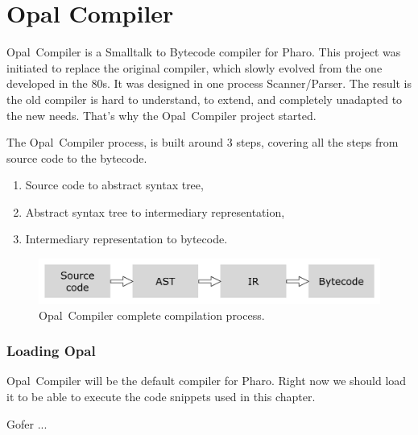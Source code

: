 \documentclass[a4paper,10pt,twoside]{book}
\begin{document}
	\sloppy
\fi


\newcommand{\opal}[0]{Opal~Compiler } %
\chapter{Opal Compiler} 


\opal is a Smalltalk to Bytecode compiler for Pharo. This project was initiated to replace the original compiler, which slowly evolved from the one developed in the 80s. It was designed in one process Scanner/Parser. The result is the old compiler is hard to understand, to extend, and completely unadapted to the new needs. That's why the \opal project started. 

The \opal process, is built around 3 steps, covering all the steps from source code to the bytecode.

\begin{enumerate}
\item Source code to abstract syntax tree,
\item Abstract syntax tree to intermediary representation,
\item Intermediary representation to bytecode.
\end{enumerate}

\begin{figure}[ht]\centering
	\includegraphics[width=\linewidth]{fullProcess}
	\caption{\opal complete compilation process. }
\end{figure}


\subsection{Loading Opal}

\opal will be the default compiler for Pharo. Right now we should load it to be able to execute the code snippets used in this chapter.

\begin{code}{}
Gofer
	...
	

\end{code}
\end{document}
